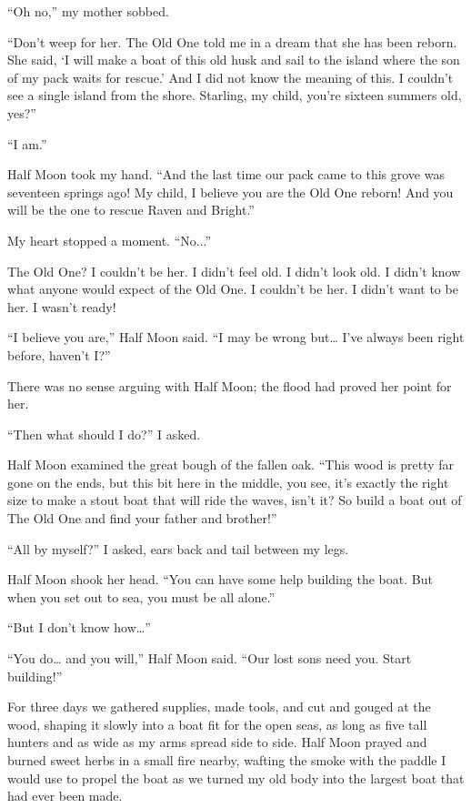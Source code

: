 ``Oh no,'' my mother sobbed.

``Don't weep for her. The Old One told me in a dream that she has been reborn. She said, `I will make a boat of this old husk and sail to the island where the son of my pack waits for rescue.' And I did not know the meaning of this. I couldn't see a single island from the shore. Starling, my child, you're sixteen summers old, yes?''

``I am.''

Half Moon took my hand. ``And the last time our pack came to this grove was seventeen springs ago! My child, I believe you are the Old One reborn! And you will be the one to rescue Raven and Bright.''

My heart stopped a moment. ``No...''

The Old One? I couldn't be her. I didn't feel old. I didn't look old. I didn't know what anyone would expect of the Old One. I couldn't be her. I didn't want to be her. I wasn't ready!

``I believe you are,'' Half Moon said. ``I may be wrong but\ldots{} I've always been right before, haven't I?''

There was no sense arguing with Half Moon; the flood had proved her point for her.

``Then what should I do?'' I asked.

Half Moon examined the great bough of the fallen oak. ``This wood is pretty far gone on the ends, but this bit here in the middle, you see, it's exactly the right size to make a stout boat that will ride the waves, isn't it? So build a boat out of The Old One and find your father and brother!''

``All by myself?'' I asked, ears back and tail between my legs.

Half Moon shook her head. ``You can have some help building the boat. But when you set out to sea, you must be all alone.''

``But I don't know how\ldots''

``You do\ldots{} and you will,'' Half Moon said. ``Our lost sons need you. Start building!''

\secdiv

\noindent For three days we gathered supplies, made tools, and cut and gouged at the wood, shaping it slowly into a boat fit for the open seas, as long as five tall hunters and as wide as my arms spread side to side. Half Moon prayed and burned sweet herbs in a small fire nearby, wafting the smoke with the paddle I would use to propel the boat as we turned my old body into the largest boat that had ever been made.

